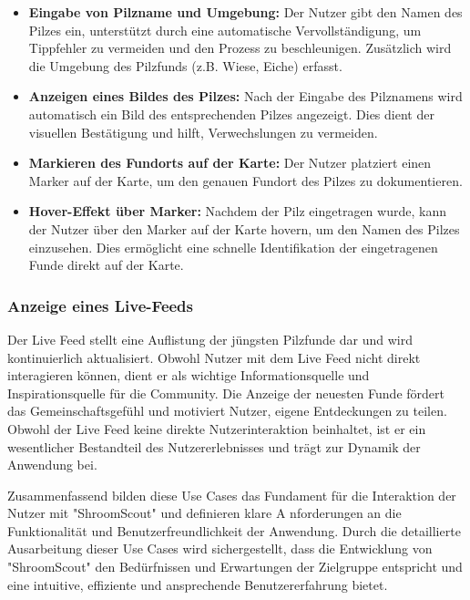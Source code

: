 \documentclass[../main.tex]{subfiles}
\begin{document}
\begin{itemize}

  \item \textbf{Eingabe von Pilzname und Umgebung:}
  Der Nutzer gibt den Namen des Pilzes ein, unterstützt durch eine automatische Vervollständigung, um Tippfehler zu vermeiden 
  und den Prozess zu beschleunigen. Zusätzlich wird die Umgebung des Pilzfunds (z.B. Wiese, Eiche) erfasst.

  \item \textbf{Anzeigen eines Bildes des Pilzes:} 
  Nach der Eingabe des Pilznamens wird automatisch ein Bild des entsprechenden Pilzes angezeigt. 
  Dies dient der visuellen Bestätigung und hilft, Verwechslungen zu vermeiden.

  \item \textbf{Markieren des Fundorts auf der Karte:} 
  Der Nutzer platziert einen Marker auf der Karte, um den genauen Fundort des Pilzes zu dokumentieren.

  \item \textbf{Hover-Effekt über Marker:} 
  Nachdem der Pilz eingetragen wurde, kann der Nutzer über den Marker auf der Karte hovern, um den 
  Namen des Pilzes einzusehen. Dies ermöglicht eine schnelle Identifikation der eingetragenen Funde direkt auf der Karte.

\end{itemize}

\subsubsection{Anzeige eines Live-Feeds}
Der Live Feed stellt eine Auflistung der jüngsten Pilzfunde dar und wird kontinuierlich aktualisiert. Obwohl Nutzer mit dem 
Live Feed nicht direkt interagieren können, dient er als wichtige Informationsquelle und Inspirationsquelle für die Community. 
Die Anzeige der neuesten Funde fördert das Gemeinschaftsgefühl und motiviert Nutzer, eigene Entdeckungen zu teilen. Obwohl der 
Live Feed keine direkte Nutzerinteraktion beinhaltet, ist er ein wesentlicher Bestandteil des Nutzererlebnisses und trägt zur 
Dynamik der Anwendung bei.

Zusammenfassend bilden diese Use Cases das Fundament für die Interaktion der Nutzer mit "ShroomScout" und definieren klare A
nforderungen an die Funktionalität und Benutzerfreundlichkeit der Anwendung. Durch die detaillierte Ausarbeitung dieser Use 
Cases wird sichergestellt, dass die Entwicklung von "ShroomScout" den Bedürfnissen und Erwartungen der Zielgruppe entspricht 
und eine intuitive, effiziente und ansprechende Benutzererfahrung bietet.
\end{document}
